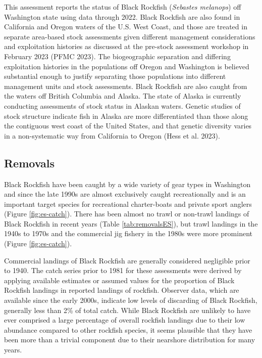 \documentclass[11pt,
  english,
  letterpaper,
]{article}
\begin{document}
This assessment reports the status of Black Rockfish (\emph{Sebastes melanops}) off Washington state using data through 2022. Black Rockfish are also found in California and Oregon waters of the U.S. West Coast, and those are treated in separate area-based stock assessments given different management considerations and exploitation histories as discussed at the pre-stock assessment workshop in February 2023 (PFMC 2023). The biogeographic separation and differing exploitation histories in the populations off Oregon and Washington is believed substantial enough to justify separating those populations into different management units and stock assessments. Black Rockfish are also caught from the waters off British Columbia and Alaska. The state of Alaska is currently conducting assessments of stock status in Alaskan waters. Genetic studies of stock structure indicate fish in Alaska are more differentiated than those along the contiguous west coast of the United States, and that genetic diversity varies in a non-systematic way from California to Oregon (Hess et al. 2023).

\hypertarget{removals}{%
\subsection*{Removals}\label{removals}}

Black Rockfish have been caught by a wide variety of gear types in Washington and since the late 1990s are almost exclusively caught recreationally and is an important target species for recreational charter-boats and private sport anglers (Figure \ref{fig:es-catch}). There has been almost no trawl or non-trawl landings of Black Rockfish in recent years (Table \ref{tab:removalsES}), but trawl landings in the 1940s to 1970s and the commercial jig fishery in the 1980s were more prominent (Figure \ref{fig:es-catch}).

Commercial landings of Black Rockfish are generally considered negligible prior to 1940. The catch series prior to 1981 for these assessments were derived by applying available estimates or assumed values for the proportion of Black Rockfish landings in reported landings of rockfish. Observer data, which are available since the early 2000s, indicate low levels of discarding of Black Rockfish, generally less than 2\% of total catch. While Black Rockfish are unlikely to have ever comprised a large percentage of overall rockfish landings due to their low abundance compared to other rockfish species, it seems plausible that they have been more than a trivial component due to their nearshore distribution for many years.
\end{document}
